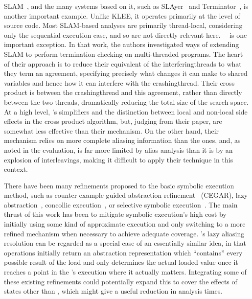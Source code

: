 SLAM~\cite{Ball2011}, and the many systems based on it, such as
SLAyer~\cite{Berdine2011} and Terminator~\cite{Cook2006a}, is another
important example.  Unlike KLEE, it operates primarily at the level of
source code.  Most SLAM-based analyses are primarily thread-local,
considering only the sequential execution case, and so are not
directly relevant here.~~\cite{Cook2007} is one important exception.
In that work, the authors investigated ways of extending SLAM to
perform termination checking on multi-threaded programs.  The heart of
their approach is to reduce their equivalent of the
\glspl{interferingthread} to what they term an agreement, specifying
precisely what changes it can make to shared variables and hence how
it can interfere with the \gls{crashingthread}.  Their cross product
is between the \gls{crashingthread} and this agreement, rather than
directly between the two threads, dramatically reducing the total size
of the search space.  At a high level, {\technique}'s simplifiers and
the distinction between local and non-local side effects in the cross
product algorithm, but, judging from their paper, are somewhat less
effective than their mechanism.  On the other hand, their mechanism
relies on more complete aliasing information than the {\technique}
ones, and, as noted in the evaluation, {\technique} is far more
limited by alias analysis than it is by an explosion of interleavings,
making it difficult to apply their technique in this context.

There have been many refinements proposed to the basic symbolic
execution method, such as counter-example guided abstraction
refinement~\cite{Clarke2003} (CEGAR), lazy
abstraction~\cite{Henzinger2002}, concollic execution~\cite{Sen2005},
or selective symbolic execution~\cite{Chipounov2011}.  The main thrust
of this work has been to mitigate symbolic execution's high cost by
initially using some kind of approximate execution and only switching
to a more refined mechanism when necessary to achieve adequate
coverage.  {\Technique}'s lazy aliasing resolution can be regarded as
a special case of an essentially similar idea, in that 
operations initially return an abstraction representation which
``contains'' every possible result of the load and {\technique} only
determines the actual loaded value once it reaches a point in the
{\StateMachine}'s execution where it actually matters.  Integrating
some of these existing refinements could potentially expand this to
cover the effects of states other than , which might give
a useful reduction in analysis times.

